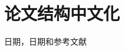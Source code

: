 \section{论文结构中文化}
日期，日期和参考文献
\begin{shellcmd}
\renewcommand{\bibname}{\begin{center} \sffamily 参考文献 \end{center}}
\renewcommand{\today}{\number\year 年 \number\month 月 \number\day 日}
\renewcommand{\contentsname}{目录}
\end{shellcmd}


